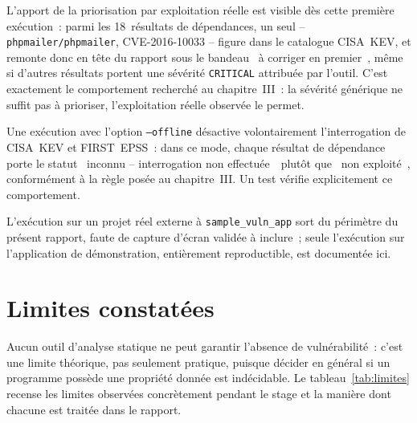 \documentclass[12pt,a4paper,oneside]{report}
\begin{document}
L'apport de la priorisation par exploitation r\'eelle est visible d\`es cette premi\`ere ex\'ecution~: parmi les 18~r\'esultats de d\'ependances, un seul -- \texttt{phpmailer/phpmailer}, CVE-2016-10033 -- figure dans le catalogue CISA~KEV, et remonte donc en t\^ete du rapport sous le bandeau \guillemotleft~\`a corriger en premier~\guillemotright, m\^eme si d'autres r\'esultats portent une s\'ev\'erit\'e \texttt{CRITICAL} attribu\'ee par l'outil. C'est exactement le comportement recherch\'e au chapitre~III~: la s\'ev\'erit\'e g\'en\'erique ne suffit pas \`a prioriser, l'exploitation r\'eelle observ\'ee le permet.

Une ex\'ecution avec l'option \texttt{--offline} d\'esactive volontairement l'interrogation de CISA~KEV et FIRST~EPSS~: dans ce mode, chaque r\'esultat de d\'ependance porte le statut \guillemotleft~inconnu -- interrogation non effectu\'ee~\guillemotright\ plut\^ot que \guillemotleft~non exploit\'e~\guillemotright, conform\'ement \`a la r\`egle pos\'ee au chapitre~III. Un test v\'erifie explicitement ce comportement.

L'ex\'ecution sur un projet r\'eel externe \`a \texttt{sample\_vuln\_app} sort du p\'erim\`etre du pr\'esent rapport, faute de capture d'\'ecran valid\'ee \`a inclure~; seule l'ex\'ecution sur l'application de d\'emonstration, enti\`erement reproductible, est document\'ee ici.

\section{Limites constat\'ees}
Aucun outil d'analyse statique ne peut garantir l'absence de vuln\'erabilit\'e~: c'est une limite th\'eorique, pas seulement pratique, puisque d\'ecider en g\'en\'eral si un programme poss\`ede une propri\'et\'e donn\'ee est ind\'ecidable. Le tableau~\ref{tab:limites} recense les limites observ\'ees concr\`etement pendant le stage et la mani\`ere dont chacune est trait\'ee dans le rapport.
\end{document}
